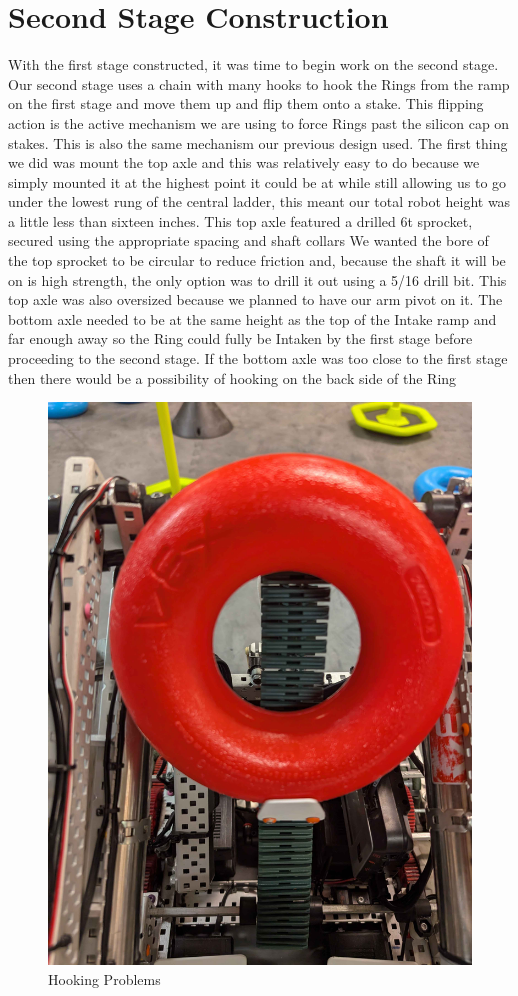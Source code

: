 \section*{Second Stage Construction}
With the first stage constructed, it was time to begin work on the second stage. Our second stage uses a chain with many hooks to hook the Rings from the ramp on the first stage and move them up and flip them onto a stake. This flipping action is the active mechanism we are using to force Rings past the silicon cap on stakes. This is also the same mechanism our previous design used. The first thing we did was mount the top axle and this was relatively easy to do because we simply mounted it at the highest point it could be at while still allowing us to go under the lowest rung of the central ladder, this meant our total robot height was a little less than sixteen inches. This top axle featured a drilled 6t sprocket, secured using the appropriate spacing and shaft collars We wanted the bore of the top sprocket to be circular to reduce friction and, because the shaft it will be on is high strength, the only option was to drill it out using a 5/16 drill bit. This top axle was also oversized because we planned to have our arm pivot on it. The bottom axle needed to be at the same height as the top of the Intake ramp and far enough away so the Ring could fully be Intaken by the first stage before proceeding to the second stage. If the bottom axle was too close to the first stage then there would be a possibility of hooking on the back side of the Ring 
\begin{figure}[H]
    \centering
    \includegraphics[width=0.5\linewidth]{images/hookbacksidering.jpg}
    \caption{Hooking Problems}
\end{figure}
